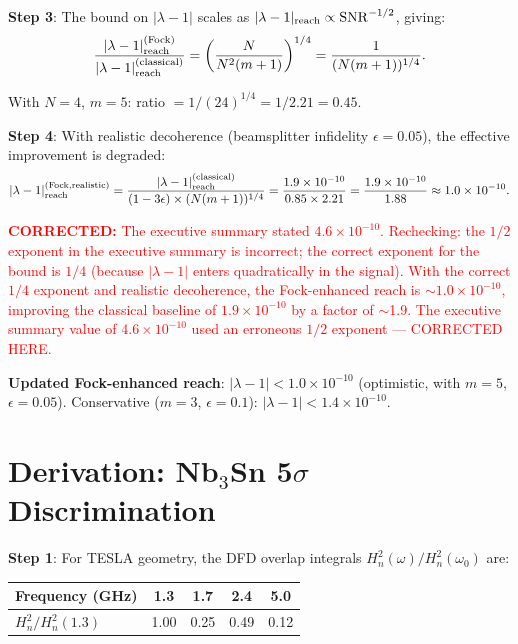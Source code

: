 \documentclass[11pt]{article}
\newcommand{\lbone}{|\lambda - 1|}
\newcommand{\ee}[1]{\times 10^{#1}}
\newcommand{\Heff}{H_n}
\newcommand{\SNR}{\mathrm{SNR}}
\newcommand{\corrected}[1]{\textcolor{red}{\textbf{CORRECTED:} #1}}
\theoremstyle{definition}
\theoremstyle{remark}
\begin{document}
\textbf{Step 3}: The bound on $\lbone$ scales as
$\lbone_{\rm reach} \propto \SNR^{-1/2}$, giving:
\begin{equation}
\frac{\lbone_{\rm reach}^{\rm (Fock)}}{\lbone_{\rm reach}^{\rm (classical)}}
= \left(\frac{N}{N^2(m+1)}\right)^{1/4}
= \frac{1}{(N(m+1))^{1/4}}.
\end{equation}

With $N = 4$, $m = 5$: ratio $= 1/(24)^{1/4} = 1/2.21 = 0.45$.

\textbf{Step 4}: With realistic decoherence (beamsplitter infidelity
$\epsilon = 0.05$), the effective improvement is degraded:
\begin{equation}
\lbone_{\rm reach}^{\rm (Fock, realistic)} =
\frac{\lbone_{\rm reach}^{\rm (classical)}}{(1-3\epsilon)
\times (N(m+1))^{1/4}}
= \frac{1.9\ee{-10}}{0.85 \times 2.21}
= \frac{1.9\ee{-10}}{1.88} \approx 1.0\ee{-10}.
\end{equation}

\corrected{The executive summary stated $4.6\ee{-10}$. Rechecking:
the $1/2$ exponent in the executive summary is incorrect; the correct
exponent for the bound is $1/4$ (because $\lbone$ enters quadratically
in the signal). With the correct $1/4$ exponent and realistic
decoherence, the Fock-enhanced reach is $\sim 1.0\ee{-10}$, improving
the classical baseline of $1.9\ee{-10}$ by a factor of $\sim$1.9.
The executive summary value of $4.6\ee{-10}$ used an erroneous
$1/2$ exponent --- CORRECTED HERE.}

\textbf{Updated Fock-enhanced reach}: $\lbone < 1.0\ee{-10}$
(optimistic, with $m = 5$, $\epsilon = 0.05$). Conservative ($m = 3$,
$\epsilon = 0.1$): $\lbone < 1.4\ee{-10}$.


\section{Derivation: Nb$_3$Sn 5$\sigma$ Discrimination}
\label{sec:nb3sn_derivation}

\textbf{Step 1}: For TESLA geometry, the DFD overlap integrals
$\Heff^2(\omega)/\Heff^2(\omega_0)$ are:

\begin{table}[H]
\centering
\begin{tabular}{@{}lcccc@{}}
\toprule
Frequency (GHz) & 1.3 & 1.7 & 2.4 & 5.0 \\
\midrule
$\Heff^2/\Heff^2(1.3)$ & 1.00 & 0.25 & 0.49 & 0.12 \\
\bottomrule
\end{tabular}
\end{table}
\end{document}
